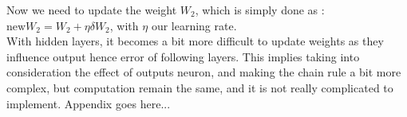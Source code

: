 Now we need to update the weight $W_2$, which is simply done as : $\textrm{new} W_2 = W_2 + \eta \delta W_2$, with $\eta$ our learning rate.\\

With hidden layers, it becomes a bit more difficult to update weights as they influence output hence error of following layers. This implies taking into consideration the effect of outputs neuron, and making the chain rule a bit more complex, but computation remain the same, and it is not really complicated to implement.
Appendix goes here...